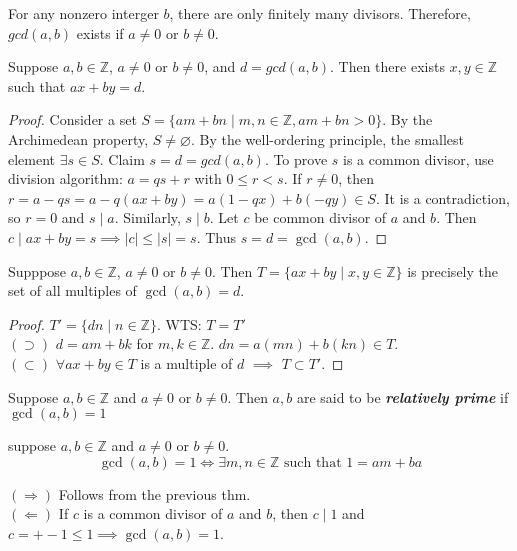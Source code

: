 \documentclass{article}
\begin{document}
\begin{multicols}{2}
\begin{remark}
For any nonzero interger $b$, there are only finitely many divisors. Therefore, $gcd(a,b)$ exists if $a\neq 0$ or $b\neq 0$.
\end{remark}

\begin{mytheorem}
Suppose $a,b\in \mathbb{Z}$, $a\neq 0$ or $b\neq 0$, and $d=gcd(a,b)$. Then there exists $x,y\in \mathbb{Z}$ such that $ax+by=d$.
\end{mytheorem}
\begin{proof}
Consider a set $S=\{am+bn\mid m,n\in \mathbb{Z}, am+bn>0\}$. By the Archimedean property, $S\neq \varnothing$. By the well-ordering principle, the smallest element $\exists s\in S$. Claim $s=d=gcd(a,b)$. To prove $s$ is a common divisor, use division algorithm: $a=qs+r$ with $0\leq r<s$. If $r\neq 0$, then $r=a-qs=a-q(ax+by)=a(1-qx)+b(-qy)\in S$. It is a contradiction, so $r=0$ and $s\mid a$. Similarly, $s\mid b$. Let $c$ be common divisor of $a$ and $b$. Then $c\mid ax+by=s \implies |c|\leq |s|=s$. Thus $s=d=\gcd(a,b)$. 
\end{proof}

\begin{mycorollary}
Supppose $a,b\in \mathbb{Z}$, $a\neq 0$ or $b\neq 0$. Then $T=\{ax+by\mid x,y\in \mathbb{Z}\}$ is precisely the set of all multiples of $\gcd(a,b)=d$.
\end{mycorollary}
\begin{proof}
$T'=\{dn\mid n\in \mathbb{Z}\}$. WTS: $T=T'$\\
$(\supset)$ $d=am+bk$ for $m,k\in \mathbb{Z}$. $dn = a(mn)+b(kn)\in T$.\\
$(\subset)$ $\forall ax+by\in T$ is a multiple of $d$ $\implies$ $T\subset T'$.
\end{proof}

\begin{mydefinition}
Suppose $a,b\in \mathbb{Z}$ and $a\neq 0$ or $b\neq 0$. Then $a,b$ are said to be \textbf{\emph{relatively prime}} if $\gcd(a,b)=1$
\end{mydefinition}

\begin{mytheorem}
suppose $a,b\in \mathbb{Z}$ and $a\neq 0$ or $b\neq 0$.
$$\gcd(a,b)=1\iff \exists m,n\in \mathbb{Z} \text{ such that }1=am+ba$$
\end{mytheorem}
\begin{myproposition}
$(\Rightarrow)$ Follows from the previous thm.\\
$(\Leftarrow)$ If $c$ is a common divisor of $a$ and $b$, then $c\mid 1$ and $c=+-1\leq 1 \implies \gcd(a,b)=1$. 
\end{myproposition}


\end{multicols}
\end{document}
